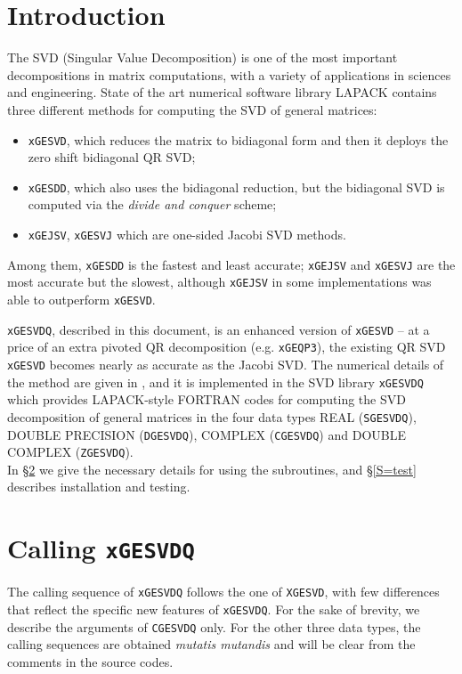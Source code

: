 \documentclass[12pt, a4paper, final]{article}
\numberwithin{equation}{section}
\begin{document}
\section{Introduction}\label{S=Introduction}
The SVD (Singular Value Decomposition) is one of the most important decompositions in matrix computations, with a variety of applications in sciences and engineering.
State of the art numerical software library LAPACK \cite{LAPACK} contains three different methods for computing the SVD of general matrices: 
\begin{itemize}
\item \texttt{xGESVD}, which reduces the matrix to bidiagonal form and then it deploys the zero shift bidiagonal QR SVD; 
\item \texttt{xGESDD}, which also uses the bidiagonal reduction, but the bidiagonal SVD is computed via the \emph{divide and conquer} scheme; 
\item \texttt{xGEJSV}, \texttt{xGESVJ} which are one-sided Jacobi SVD methods. 
\end{itemize}
Among them, \texttt{xGESDD} is the fastest and least accurate; \texttt{xGEJSV} and \texttt{xGESVJ} are the most accurate but the slowest, although \texttt{xGEJSV} in some implementations was able to outperform \texttt{xGESVD}.


\texttt{xGESVDQ}, described in this document, is an enhanced version of \texttt{xGESVD} -- at a price of an extra pivoted QR decomposition (e.g. \texttt{xGEQP3}), the existing QR SVD \texttt{xGESVD} becomes nearly as accurate as the Jacobi SVD.
The numerical details of the method are given in \cite{drm-xgesvd-paper}, and it is implemented in the SVD library \texttt{xGESVDQ} which  provides LAPACK-style FORTRAN codes for computing the SVD decomposition of general matrices in the four data types REAL (\texttt{SGESVDQ}), DOUBLE PRECISION (\texttt{DGESVDQ}), COMPLEX (\texttt{CGESVDQ}) and DOUBLE COMPLEX (\texttt{ZGESVDQ}).
\\ 
 
\noindent In \S \ref{S=1} we give the necessary details for using the subroutines, and \S \ref{S=test} describes installation and testing.


\section{Calling \texttt{xGESVDQ}}\label{S=1}
The calling sequence of \texttt{xGESVDQ} follows the one of \texttt{XGESVD}, with few differences that reflect the specific new features of \texttt{xGESVDQ}.   
For the sake of brevity, we describe the arguments of \texttt{CGESVDQ} only. For the other three data types, the calling sequences are obtained \emph{mutatis mutandis} and will be clear from the comments in the source codes.
\end{document}
